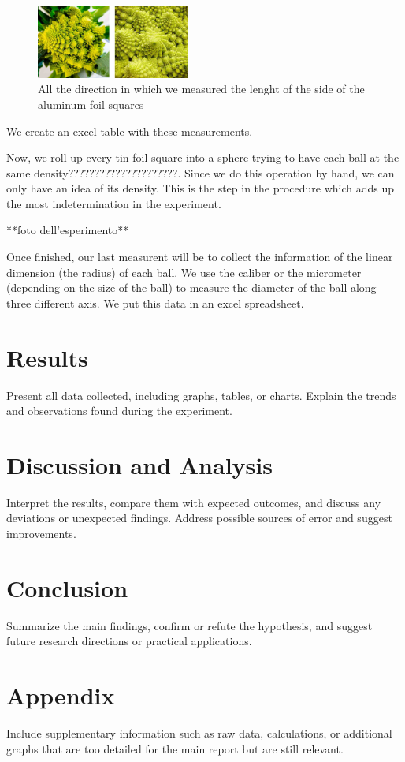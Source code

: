 \documentclass[a4paper,12pt]{article}
\begin{document}
\begin{figure}[h]
    \centering
    \includegraphics[width = 0.45\textwidth]{Cauliflower.jpg}
    \caption{All the direction in which we measured the lenght of the side of the aluminum foil squares}
    \label{fig:sq_measure}
\end{figure}

We create an excel table with these measurements.

Now, we roll up every tin foil square into a sphere trying to have each ball at the same density?????????????????????. 
Since we do this operation by hand, we can only have an idea of its density. This is the step in the 
procedure which adds up the most indetermination in the experiment.

**foto dell'esperimento**

Once finished, our last measurent will be to collect the information of the linear dimension (the radius) 
of each ball. We use the caliber or the micrometer (depending on the size of the ball) to measure the diameter 
of the ball along three different axis. We put this data in an excel spreadsheet.

\section{Results}
Present all data collected, including graphs, tables, or charts. Explain the trends and observations found during the experiment.

\section{Discussion and Analysis}
Interpret the results, compare them with expected outcomes, and discuss any deviations or unexpected findings. Address possible sources of error and suggest improvements.

\section{Conclusion}
Summarize the main findings, confirm or refute the hypothesis, and suggest future research directions or practical applications.

\section{Appendix}
Include supplementary information such as raw data, calculations, or additional graphs that are too detailed for the main report but are still relevant.

\printbibliography
\end{document}
